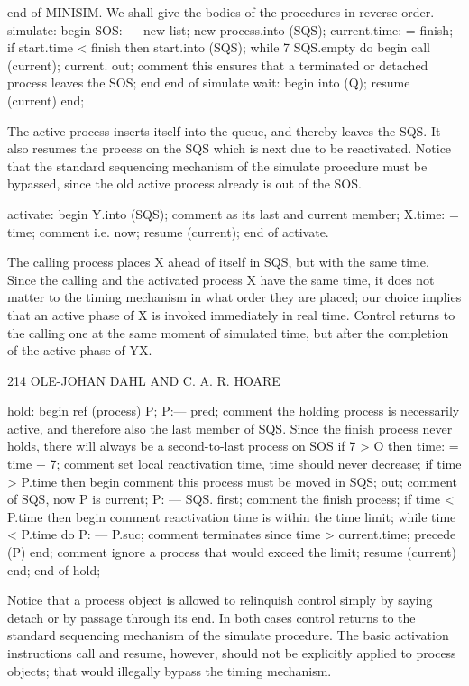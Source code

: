 {{{{{		end of MINISIM. We shall give the bodies of the procedures in reverse order. simulate: begin SOS: — new list; new process.into (SQS); current.time: = finish; if start.time < finish then start.into (SQS); while 7 SQS.empty do begin call (current); current. out; comment this ensures that a terminated or detached process leaves the SOS; end end of simulate wait: begin into (Q); resume (current) end;
		
		The active process inserts itself into the queue, and thereby leaves the SQS. It also resumes the process on the SQS which is next due to be reactivated. Notice that the standard sequencing mechanism of the simulate procedure must be bypassed, since the old active process already is out of the SOS.
		
		activate: begin Y.into (SQS); comment as its last and current member; X.time: = time; comment i.e. now; resume (current); end of activate.
		
		The calling process places X ahead of itself in SQS, but with the same time. Since the calling and the activated process X have the same time, it does not matter to the timing mechanism in what order they are placed; our choice implies that an active phase of X is invoked immediately in real time. Control returns to the calling one at the same moment of simulated time, but after the completion of the active phase of YX.
		
		214 OLE-JOHAN DAHL AND C. A. R. HOARE
		
		hold: begin ref (process) P; P:— pred; comment the holding process is necessarily active, and therefore also the last member of SQS. Since the finish process never holds, there will always be a second-to-last process on SOS if 7 > O then time: = time + 7; comment set local reactivation time, time should never decrease; if time > P.time then begin comment this process must be moved in SQS; out; comment of SQS, now P is current; P: — SQS. first; comment the finish process; if time < P.time then begin comment reactivation time is within the time limit; while time < P.time do P: — P.suc; comment terminates since time > current.time; precede (P) end; comment ignore a process that would exceed the limit; resume (current) end; end of hold;
		
		Notice that a process object is allowed to relinquish control simply by saying detach or by passage through its end. In both cases control returns to the standard sequencing mechanism of the simulate procedure. The basic activation instructions call and resume, however, should not be explicitly applied to process objects; that would illegally bypass the timing mechanism.
		
}}}}}
